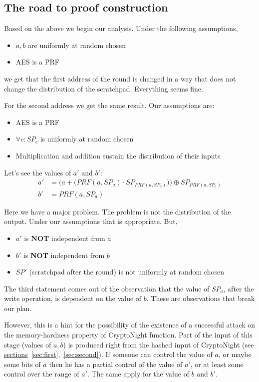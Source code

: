 \subsection{The road to proof construction}
Based on the above we begin our analysis. Under the following assumptions,
\begin{itemize}
  \item $a,b$ are uniformly at random chosen
  \item AES is a PRF
\end{itemize}
we get that the first address of the round is changed in a way that does not change the distribution of the scratchpad. Everything seems fine.

For the second address we get the same result. Our assumptions are:
\begin{itemize}
  \item AES is a PRF
  \item $\forall c : SP_c$ is uniformly at random chosen
  \item Multiplication and addition sustain the distribution of their inputs
\end{itemize}

Let's see the values of $a'$ and $b'$:
\begin{align} \label{eq:normal_1}
  a' &= \Big( a + \big( PRF(a, SP_{a}) \cdot SP_{PRF(a, SP_a)} \big) \Big) \oplus SP_{PRF(a, SP_a)}\\ b' &= PRF(a, SP_{a}) \label{eq:normal_2}
\end{align}

Here we have a major problem. The problem is not the distribution of the output. Under our assumptions that is appropriate. But,
\begin{itemize}
  \item $a'$ is \textbf{NOT} independent from $a$
  \item $b'$ is \textbf{NOT} independent from $b$
  \item $SP'$ (scratchpad after the round) is not uniformly at random chosen
\end{itemize}
The third statement comes out of the observation that the value of $SP_a$, after the write operation, is dependent on the value of $b$. These are observations that break our plan.

However, this is a hint for the possibility of the existence of a successful attack on the memory-hardness property of CryptoNight function. Part of the input of this stage (values of $a,b$) is produced right from the hashed input of CryptoNight (see \hyperref[sec:first]{sections}~\ref{sec:first},~\ref{sec:second}). If someone can control the value of $a$, or maybe some bits of $a$ then he has a partial control of the value of $a'$, or at least some control over the range of $a'$. The same apply for the value of $b$ and $b'$.

